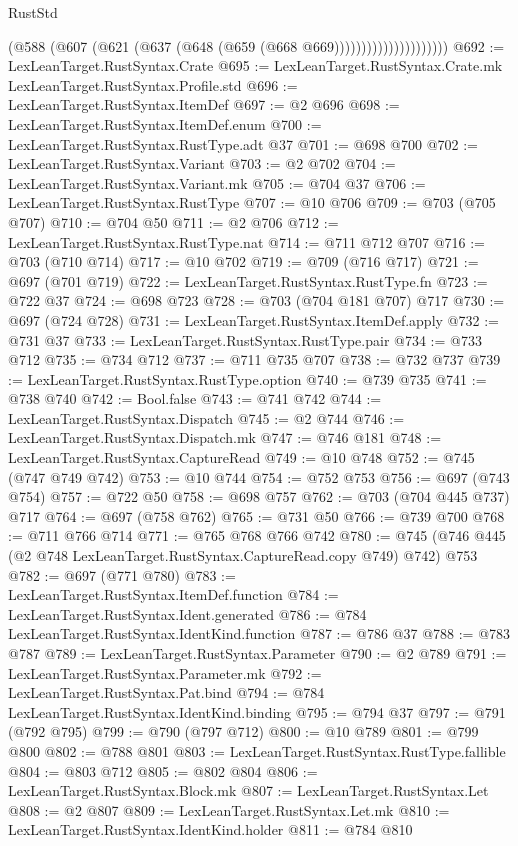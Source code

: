 \begin{lexlean}{RustStd}
\begin{coremodule}
                                (@588 (@607 (@621 (@637 (@648 (@659 (@668 @669)))))))))))))))))))))
@692 := LexLeanTarget.RustSyntax.Crate
@695 := LexLeanTarget.RustSyntax.Crate.mk LexLeanTarget.RustSyntax.Profile.std
@696 := LexLeanTarget.RustSyntax.ItemDef
@697 := @2 @696
@698 := LexLeanTarget.RustSyntax.ItemDef.enum
@700 := LexLeanTarget.RustSyntax.RustType.adt @37
@701 := @698 @700
@702 := LexLeanTarget.RustSyntax.Variant
@703 := @2 @702
@704 := LexLeanTarget.RustSyntax.Variant.mk
@705 := @704 @37
@706 := LexLeanTarget.RustSyntax.RustType
@707 := @10 @706
@709 := @703 (@705 @707)
@710 := @704 @50
@711 := @2 @706
@712 := LexLeanTarget.RustSyntax.RustType.nat
@714 := @711 @712 @707
@716 := @703 (@710 @714)
@717 := @10 @702
@719 := @709 (@716 @717)
@721 := @697 (@701 @719)
@722 := LexLeanTarget.RustSyntax.RustType.fn
@723 := @722 @37
@724 := @698 @723
@728 := @703 (@704 @181 @707) @717
@730 := @697 (@724 @728)
@731 := LexLeanTarget.RustSyntax.ItemDef.apply
@732 := @731 @37
@733 := LexLeanTarget.RustSyntax.RustType.pair
@734 := @733 @712
@735 := @734 @712
@737 := @711 @735 @707
@738 := @732 @737
@739 := LexLeanTarget.RustSyntax.RustType.option
@740 := @739 @735
@741 := @738 @740
@742 := Bool.false
@743 := @741 @742
@744 := LexLeanTarget.RustSyntax.Dispatch
@745 := @2 @744
@746 := LexLeanTarget.RustSyntax.Dispatch.mk
@747 := @746 @181
@748 := LexLeanTarget.RustSyntax.CaptureRead
@749 := @10 @748
@752 := @745 (@747 @749 @742)
@753 := @10 @744
@754 := @752 @753
@756 := @697 (@743 @754)
@757 := @722 @50
@758 := @698 @757
@762 := @703 (@704 @445 @737) @717
@764 := @697 (@758 @762)
@765 := @731 @50
@766 := @739 @700
@768 := @711 @766 @714
@771 := @765 @768 @766 @742
@780 := @745 (@746 @445 (@2 @748 LexLeanTarget.RustSyntax.CaptureRead.copy @749) @742) @753
@782 := @697 (@771 @780)
@783 := LexLeanTarget.RustSyntax.ItemDef.function
@784 := LexLeanTarget.RustSyntax.Ident.generated
@786 := @784 LexLeanTarget.RustSyntax.IdentKind.function
@787 := @786 @37
@788 := @783 @787
@789 := LexLeanTarget.RustSyntax.Parameter
@790 := @2 @789
@791 := LexLeanTarget.RustSyntax.Parameter.mk
@792 := LexLeanTarget.RustSyntax.Pat.bind
@794 := @784 LexLeanTarget.RustSyntax.IdentKind.binding
@795 := @794 @37
@797 := @791 (@792 @795)
@799 := @790 (@797 @712)
@800 := @10 @789
@801 := @799 @800
@802 := @788 @801
@803 := LexLeanTarget.RustSyntax.RustType.fallible
@804 := @803 @712
@805 := @802 @804
@806 := LexLeanTarget.RustSyntax.Block.mk
@807 := LexLeanTarget.RustSyntax.Let
@808 := @2 @807
@809 := LexLeanTarget.RustSyntax.Let.mk
@810 := LexLeanTarget.RustSyntax.IdentKind.holder
@811 := @784 @810

\end{coremodule}
\end{lexlean}
